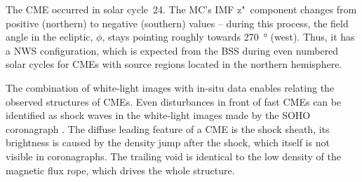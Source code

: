 \pagebreak

The CME occurred in solar cycle~24. The MC's IMF z"~component changes from positive (northern) to negative (southern) values -- during this process, the field angle in the ecliptic, $\phi$, stays pointing roughly towards \SI{270}{\degree} (west). Thus, it has a NWS configuration, which is expected from the BSS during even numbered solar cycles for CMEs with source regions located in the northern hemisphere.

The combination of white-light images with in-situ data enables relating the observed structures of CMEs. Even disturbances in front of fast CMEs can be identified as shock waves in the white-light images made by the SOHO coronagraph \citep{Sheeley2000}. The diffuse leading feature of a CME is the shock sheath, its brightness is caused by the density jump after the shock, which itself is not visible in coronagraphs. The trailing void is identical to the low density of the magnetic flux rope, which drives the whole structure.

